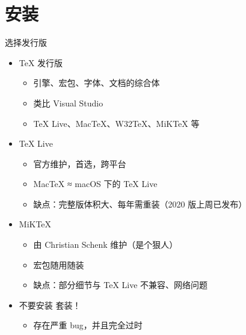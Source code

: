 \section{安装}

\begin{frame}{选择发行版}
\begin{itemize}
  \item \TeX{} 发行版

    \begin{itemize}
      \item 引擎、宏包、字体、文档的综合体
      \item 类比 Visual Studio
      \item \TeX{} Live、Mac\TeX{}、W32\TeX{}、MiK\TeX{} 等
    \end{itemize} \pause

  \item \TeX{} Live 

    \begin{itemize}
      \item 官方维护，首选，跨平台
      \item Mac\TeX{} ≈ macOS 下的 \TeX{} Live
      \item 缺点：完整版体积大、每年需重装（2020 版上周已发布）
    \end{itemize}

  \item MiK\TeX{} 

    \begin{itemize}
      \item 由 Christian Schenk 维护（是个狠人）
      \item 宏包随用随装
      \item 缺点：部分细节与 \TeX{} Live 不兼容、网络问题
    \end{itemize} \pause

  \item \alert{不要安装 \CTeX{} 套装！}

    \begin{itemize}
      \item \alert{存在严重 bug，并且完全过时}
    \end{itemize}
\end{itemize}
\end{frame}

